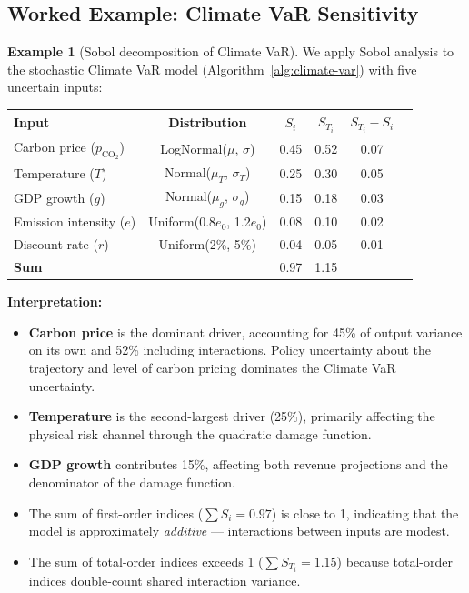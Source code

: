 \documentclass[11pt, a4paper]{article}
\theoremstyle{definition}
\newtheorem{example}{Example}[section]
\theoremstyle{plain}
\theoremstyle{remark}
\begin{document}
\subsection{Worked Example: Climate VaR Sensitivity}

\begin{example}[Sobol decomposition of Climate VaR]\label{ex:sobol}
We apply Sobol analysis to the stochastic Climate VaR model
(Algorithm~\ref{alg:climate-var}) with five uncertain inputs:
\begin{center}
\begin{tabular}{@{}lccccc@{}}
\toprule
\textbf{Input} & \textbf{Distribution} & $S_i$ & $S_{T_i}$ &
$S_{T_i} - S_i$ \\
\midrule
Carbon price ($p_{\text{CO}_2}$) & LogNormal($\mu$, $\sigma$) & 0.45 & 0.52 & 0.07 \\
Temperature ($T$)                & Normal($\mu_T$, $\sigma_T$) & 0.25 & 0.30 & 0.05 \\
GDP growth ($g$)                 & Normal($\mu_g$, $\sigma_g$) & 0.15 & 0.18 & 0.03 \\
Emission intensity ($e$)         & Uniform(0.8$e_0$, 1.2$e_0$) & 0.08 & 0.10 & 0.02 \\
Discount rate ($r$)              & Uniform(2\%, 5\%)            & 0.04 & 0.05 & 0.01 \\
\midrule
\textbf{Sum} & & 0.97 & 1.15 & \\
\bottomrule
\end{tabular}
\end{center}

\textbf{Interpretation:}
\begin{itemize}
    \item \textbf{Carbon price} is the dominant driver, accounting for 45\% of
          output variance on its own and 52\% including interactions.
          Policy uncertainty about the trajectory and level of carbon pricing
          dominates the Climate VaR uncertainty.
    \item \textbf{Temperature} is the second-largest driver (25\%), primarily
          affecting the physical risk channel through the quadratic damage function.
    \item \textbf{GDP growth} contributes 15\%, affecting both revenue projections
          and the denominator of the damage function.
    \item The sum of first-order indices ($\sum S_i = 0.97$) is close to 1,
          indicating that the model is approximately \emph{additive} ---
          interactions between inputs are modest.
    \item The sum of total-order indices exceeds 1 ($\sum S_{T_i} = 1.15$)
          because total-order indices double-count shared interaction variance.
\end{itemize}
\end{example}
\end{document}
